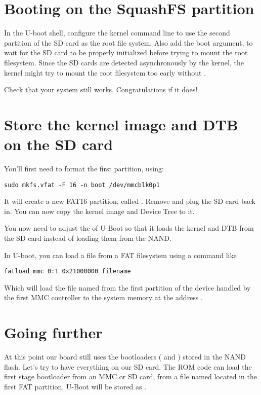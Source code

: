 \section{Booting on the SquashFS partition}

In the U-boot shell, configure the kernel command line to use the
second partition of the SD card as the root file system. Also add the
 boot argument, to wait for the SD card to be properly
initialized before trying to mount the root filesystem. Since the SD
cards are detected asynchronously by the kernel, the kernel might try
to mount the root filesystem too early without .

Check that your system still works. Congratulations if it does!

\section{Store the kernel image and DTB on the SD card}

You'll first need to format the first partition, using:
\begin{verbatim}
sudo mkfs.vfat -F 16 -n boot /dev/mmcblk0p1
\end{verbatim}

It will create a new FAT16 partition, called . Remove and
plug the SD card back in. You can now copy the kernel image and
Device Tree to it.

You now need to adjust the  of U-Boot so
that it loads the kernel and DTB from the SD card instead of loading
them from the NAND.

In U-boot, you can load a file from a FAT filesystem using a command
like

\begin{verbatim}
fatload mmc 0:1 0x21000000 filename
\end{verbatim}

Which will load the file named  from the first
partition of the device handled by the first MMC controller to the
system memory at the address .

\section{Going further}

At this point our board still uses the bootloaders
( and ) stored in the NAND flash.
Let's try to have everything on our SD card.
The ROM code can load the first stage bootloader from an MMC or SD
card, from a file named  located in the first FAT
partition. U-Boot will be stored as .

